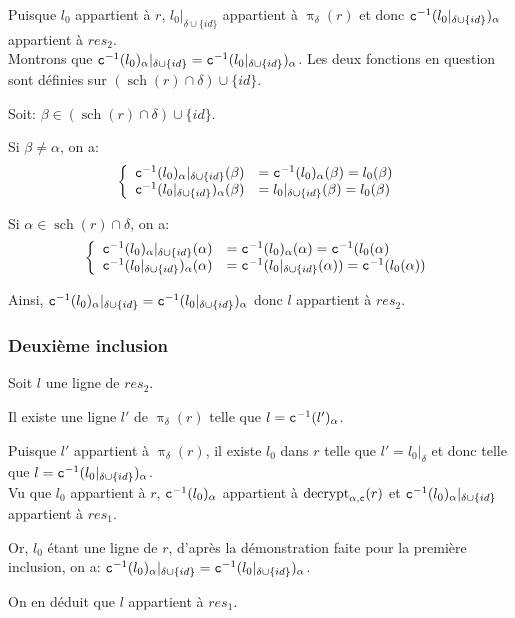\documentclass[french]{article}
\DeclareMathOperator{\proj}{\pi}
\DeclareMathOperator{\decrypt}{decrypt}
\DeclareMathOperator{\s}{sch}
\newcommand\typeT[1]{\text{\ttfamily #1}}
\newcommand{\decryptArgs}[2]{\decrypt_{#1 , \typeT{#2}}}
\newcommand{\projDelta}{\proj_{\delta}}
\newcommand{\decryptCAlpha}{\decryptArgs{\alpha}{c}}
\newcommand{\dc}[1]{\typeT{c}^{-1}(#1)}
\newcommand{\cip}{\cup \{id\}}
\begin{document}
Puisque $l_0$ appartient à $r$, $l_0|_{\delta \cip}$
appartient à $\projDelta(r)$ et donc
$\dc{l_0|_{\delta \cip}}_\alpha$ appartient à $res_2$. \\

Montrons que $\dc{l_0}_\alpha|_{\delta \cip} = \dc{l_0|_{\delta \cip}}_\alpha$.
Les deux fonctions en question sont définies sur $(\s(r)\cap \delta) \cip$.

Soit: $\beta \in (\s(r) \cap \delta) \cip$.

Si $\beta \neq \alpha$, on a:
$$
\left\lbrace
\begin{array}{ll}
\dc{l_0}_\alpha|_{\delta \cip}(\beta) 
& = \dc{l_0}_\alpha(\beta) = l_0(\beta) \\
\dc{l_0|_{\delta \cip}}_\alpha (\beta)
& = l_0|_{\delta \cip}(\beta) = l_0(\beta)
\end{array}
\right.
$$

Si $\alpha \in \s(r) \cap \delta$, on a:
$$
\left\lbrace
\begin{array}{ll}
\dc{l_0}_\alpha|_{\delta \cip}(\alpha) 
& = \dc{l_0}_\alpha(\alpha) = \dc{l_0(\alpha} \\
\dc{l_0|_{\delta \cip}}_\alpha (\alpha)
& = \dc{l_0|_{\delta \cip}(\alpha)} = \dc{l_0(\alpha)}
\end{array}
\right.
$$

Ainsi, $\dc{l_0}_\alpha|_{\delta \cip} = \dc{l_0|_{\delta \cip}}_\alpha$
donc $l$ appartient à $res_2$.

\subsubsection*{Deuxième inclusion}
Soit $l$ une ligne de $res_2$.

Il existe une ligne $l'$ de $\projDelta(r)$
telle que $l = \dc{l'}_\alpha$.

Puisque $l'$ appartient à $\projDelta(r)$, 
il existe $l_0$ dans $r$ telle que
$l' = l_0|_\delta$ et donc telle que
$l = \dc{l_0|_{\delta \cip}}_\alpha$. \\

Vu que $l_0$ appartient à $r$, 
$\dc{l_0}_\alpha$ appartient à $\decryptCAlpha(r)$
et $\dc{l_0}_\alpha|_{\delta \cip}$ appartient à $res_1$.

Or, $l_0$ étant une ligne de $r$,
d'après la démonstration faite pour la première inclusion, on a:
$\dc{l_0}_\alpha|_{\delta \cip} = \dc{l_0|_{\delta \cip}}_\alpha$.

On en déduit que $l$ appartient à $res_1$.
\end{document}
